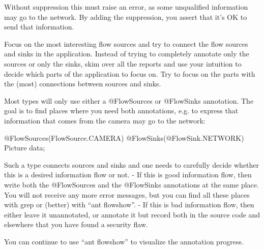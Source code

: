 Without suppression this must raise an error, as some unqualified
information may go to the network. By adding the suppression, you
assert that it’s OK to send that information.

Focus on the most interesting flow sources and try to connect the flow
sources and sinks in the application. Instead of trying to completely
annotate only the sources or only the sinks, skim over all the reports
and use your intuition to decide which parts of the application to
focus on. Try to focus on the parts with the (most) connections
between sources and sinks.

Most types will only use either a @FlowSources or @FlowSinks
annotation.
The goal is to find places where you need both annotations, e.g. to
express that information that comes from the camera may go to the
network:

    @FlowSources(FlowSource.CAMERA)
    @FlowSinks(@FlowSink.NETWORK) Picture data;

Such a type connects sources and sinks and one needs to carefully
decide whether this is a desired information flow or not.
- If this is good information flow, then write both the @FlowSources
  and the @FlowSinks annotations at the same place. You will not
  receive any more error messages, but you can find all these places
  with grep or (better) with “ant flowshow”.
- If this is bad information flow, then either leave it unannotated,
  or annotate it but record both in the source code and elsewhere that
  you have found a security flaw.

You can continue to use “ant flowshow” to visualize the annotation
progress.
